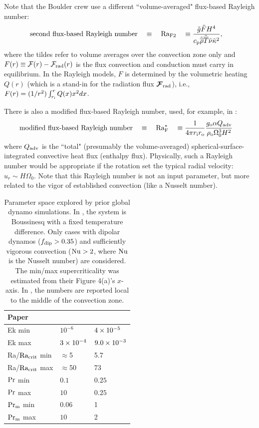 \documentclass[12pt]{article} %
\begin{document}
Note that the Boulder crew  \citep{Featherstone2016a, Featherstone2016b, Hindman2020, Matilsky2020a, Matilsky2020b, Korre2021, Camisassa2022} use a different ``volume-averaged" flux-based Rayleigh number: 
\begin{align}
	\text{second flux-based Rayleigh number} \quad & \equiv \quad {\rm{Ra_{F2}}} \quad \equiv \frac{\tilde{g}\tilde{F}H^4}{c_{\rm{p}}\tilde{\overline{\rho}}\tilde{\overline{T}}\tilde{\nu}\tilde{\kappa}^2},
\end{align}
where the tildes refer to volume averages over the convection zone only and $F(r)\equiv{\mathcal{F}}(r)-{\mathcal{F}}_{\rm{rad}}(r)$ is the flux convection and conduction must carry in equilibrium. In the Rayleigh models, $F$ is determined by the volumetric heating $Q(r)$ (which is a stand-in for the radiation flux ${\bm{\mathcal{F}}}_{\rm{rad}}$), i.e., $F(r)=(1/r^2)\int_{r_{\rm{i}}}^rQ(x)x^2dx$. 

There is also a modified flux-based Rayleigh number, used, for example, in \citet{Christensen2006}:
\begin{align}\label{def:raq}
	\text{modified flux-based Rayleigh number} \quad & \equiv \quad {\rm{Ra^*_F}} \quad \equiv \frac{1}{4\pi r_{\rm{i}}r_{\rm{o}}} \frac{g_{\rm{o}}\alpha Q_{\rm{adv}} }{\rho_{\rm{o}}\Omega_0^3H^2}
\end{align}
where $Q_{\rm{adv}}$ is the ``total" (presumably the volume-averaged) spherical-surface-integrated convective heat flux (enthalpy flux). Physically, such a Rayleigh number would be appropriate if the rotation set the typical radial velocity: $u_r\sim H\Omega_0$. Note that this Rayleigh number is not an input parameter, but more related to the vigor of established convection (like a Nusselt number). 

 \begin{table}
	\centering
	\caption{Parameter space explored by prior global dynamo simulations. In \citet{Christensen2006}, the system is Boussinesq with a fixed temperature difference. Only cases with dipolar dynamos ($f_{\rm{dip}}>0.35$) and sufficiently vigorous convection (${\rm{Nu}}>2$, where $\rm{Nu}$ is the Nusselt number) are considered. The min/max supercriticality was estimated from their Figure 4(a)'s $x$-axis. In \citet{Brun2022}, the numbers are reported local to the middle of the convection zone.}\label{tab:params}
	\begin{tabular}{l | l | l }
		\hline\hline
		Paper & \citet{Christensen2006} & \citet{Brun2022} \\
		\hline
		Ek min & $10^{-6}$ & $4\times10^{-5}$\\
		Ek max & $3\times10^{-4}$ & $9.0\times10^{-3}$ \\
		\hline
		Ra/$\rm{Ra_{crit}}$ min & $\approx$5 & 5.7 \\
		Ra/$\rm{Ra_{crit}}$ max & $\approx$50 & 73\\
		\hline
		$\rm{Pr}$ min & $0.1$ & $0.25$ \\
		$\rm{Pr}$ max & $10$ & $0.25$ \\
		\hline
		$\rm{Pr_m}$ min & $0.06$ & 1 \\
		$\rm{Pr_m}$ max & $10$ & 2 \\
		\hline
	\end{tabular}
\end{table}
		
\end{document}
